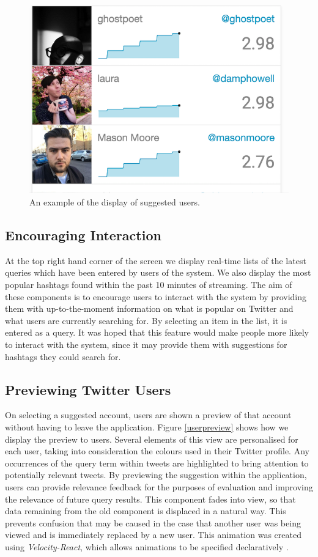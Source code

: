 \documentclass{l4proj}
\begin{document}
\begin{figure}[H]
\centering
\includegraphics[scale=0.9]{queryresults.png}
\caption{An example of the display of suggested users.}
\label{queryresults}
\end{figure} 
        
        \subsection{Encouraging Interaction}
        At the top right hand corner of the screen we display real-time lists of the latest queries which have been entered by users of the system. We also display the most popular hashtags found within the past 10 minutes of streaming. The aim of these components is to encourage users to interact with the system by providing them with up-to-the-moment information on what is popular on Twitter and what users are currently searching for. By selecting an item in the list, it is entered as a query. It was hoped that this feature would make people more likely to interact with the system, since it may provide them with suggestions for hashtags they could search for.
        
        \subsection{Previewing Twitter Users}
        On selecting a suggested account, users are shown a preview of that account without having to leave the application. Figure \ref{userpreview} shows how we display the preview to users. Several elements of this view are personalised for each user, taking into consideration the colours used in their Twitter profile. Any occurrences of the query term within tweets are highlighted to bring attention to potentially relevant tweets. By previewing the suggestion within the application, users can provide relevance feedback for the purposes of evaluation and improving the relevance of future query results. This component fades into view, so that data remaining from the old component is displaced in a natural way. This prevents confusion that may be caused in the case that another user was being viewed and is immediately replaced by a new user. This animation was created using \textit{Velocity-React}, which allows animations to be specified declaratively \cite{velocityreact}.
        
\end{document}
